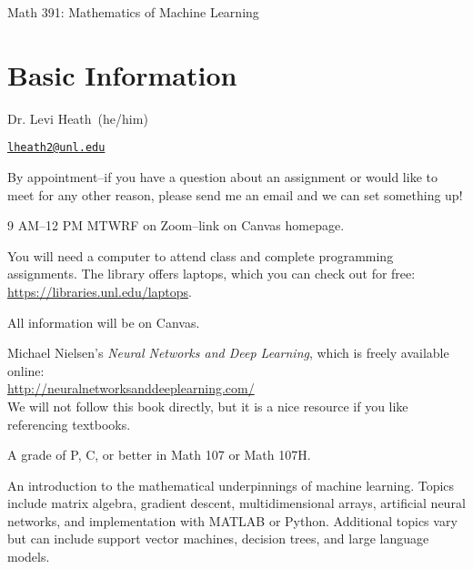 \documentclass[11pt]{article}
\makeatletter
\newcommand{\YourName}[0]{Dr. Levi Heath}
\newcommand{\YourEmailAddress}[0]{lheath2@unl.edu}
\newcommand{\YourPronouns}[0]{he/him}
\newcommand{\YourOffice}[0]{AVH 225}
\makeatother
\begin{document}
\begin{center}
    {\LARGE Math 391: Mathematics of Machine Learning}
\end{center}

\section*{Basic Information}
\vspace{-.5em}
\begin{description}[nosep]

\item[Instructor] \YourName\  (\YourPronouns) 

\item[Email] \href{mailto:\YourEmailAddress}{{\tt \YourEmailAddress}}


\item[\textcolor{red}{Office Hours}] By appointment--if you have a question about an assignment or would like to meet for any other reason, please send me an email and we can set something up! \\

\item[Class Meeting Time and Location] 9 AM--12 PM MTWRF on Zoom--link on Canvas homepage.

\item[Required Materials] You will need a computer to attend class and complete programming assignments. The library offers laptops, which you can check out for free: \href{https://libraries.unl.edu/laptops}{https://libraries.unl.edu/laptops}.  
\item[Course Website] All information will be on Canvas.

\item[Textbook] Michael Nielsen's {\it Neural Networks and Deep Learning}, which is freely available online: \\
\href{http://neuralnetworksanddeeplearning.com/}{http://neuralnetworksanddeeplearning.com/} \\
We will not follow this book directly, but it is a nice resource if you like referencing textbooks.

\item[Prerequisites] A grade of P, C, or better in Math 107 or Math 107H. \\

\item[Course Description] An introduction to the mathematical underpinnings of machine learning. Topics include matrix algebra, gradient descent, multidimensional arrays, artificial neural networks, and implementation with MATLAB or Python. Additional topics vary but can include support vector machines, decision trees, and large language models.

\end{description}
\end{document}
